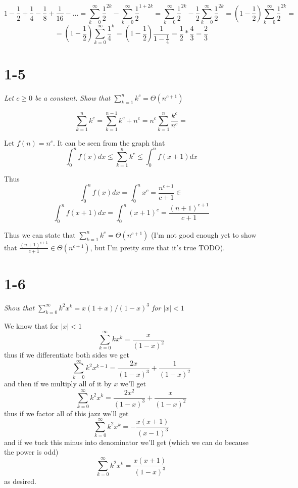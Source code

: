 \documentclass[11pt,oneside,titlepage]{book}
\begin{document}
$$1 - \frac 1 2 + \frac 1 4 - \frac 1 8
+ \frac{1}{16} - ... = 
\sum_{k = 0}^{\infty}{\frac{1}{2}^{2k}}
- \sum_{k = 0}^{\infty}{\frac{1}{2}^{1 + 2k}} =
\sum_{k = 0}^{\infty}{\frac{1}{2}^{2k}}
- \frac{1}{2}\sum_{k = 0}^{\infty}{\frac{1}{2}^{2k}} =
\left(1 - \frac{1}{2}\right)\sum_{k = 0}^{\infty}{\frac{1}{2}^{2k}} = 
$$
$$
= \left(1 - \frac{1}{2}\right)\sum_{k = 0}^{\infty}{\frac{1}{4}^{k}}
= \left(1 - \frac{1}{2}\right)\frac{1}{1 - \frac{1}{4}}
= \frac 1 2 *  \frac 4 3 = \frac 2 3
$$

\section*{1-5}
\textit{Let $c \geq 0$ be a constant. Show that
  $\sum_{k = 1}^{n}{k^c} = \Theta(n^{c + 1})$}

$$
\sum_{k = 1}^{n}{k^c} = \sum_{k = 1}^{n - 1}{k^c} + n^c =
n^c\sum_{k = 1}^{n}{\frac{k^c}{n^c}} =
$$

Let $f(n) = n^c$.
It can be seen from the graph that
$$\int_{0}^{n}{f(x)dx} \leq \sum_{k = 1}^{n}{k^c} \leq
\int_{0}^{n}{f(x + 1)dx}$$

Thus 
$$\int_0^n{f(x)dx} = \int_0^n{x^c} = \frac{n^{c + 1}}{c + 1} \in$$
$$\int_0^n{f(x + 1)dx} = \int_0^n{(x + 1)^c} = \frac{(n + 1)^{c + 1}}{c + 1}$$

Thus we can state that $\sum_{k = 1}^{n}{k^c} = \Theta(n^{c + 1})$
(I'm not good enough yet to show that $\frac{(n + 1)^{c + 1}}{c + 1} \in
\Theta(n^{c + 1})$, but I'm pretty sure that it's true TODO).



\section*{1-6}
\textit{Show that $\sum_{k=0}^{\infty}{k^2 x^k} = x(1 + x)/(1 - x)^3$ for
  $|x| < 1$}

We know that for $|x| < 1$
$$\sum_{k = 0}^{\infty}{kx^k} = \frac{x}{(1 - x)^2}$$
thus if we differentiate both sides we get
$$\sum_{k = 0}^{\infty}{k^2x^{k - 1}} = \frac{2x}{(1 - x)^3}
+ \frac{1}{(1 - x)^2} $$
and then if we multiply all of it by $x$ we'll get
$$\sum_{k = 0}^{\infty}{k^2x^k} = \frac{2x^2}{(1 - x)^3}
+ \frac{x}{(1 - x)^2} $$
thus if we factor all of this jazz we'll get
$$\sum_{k = 0}^{\infty}{k^2x^k} = - \frac{x(x + 1)}{(x - 1)^3}$$
and if we tuck this minus into denominator we'll get (which we can do because
the power is odd)
$$\sum_{k = 0}^{\infty}{k^2x^k} = \frac{x(x + 1)}{(1 - x)^3}$$
as desired.
\end{document}
